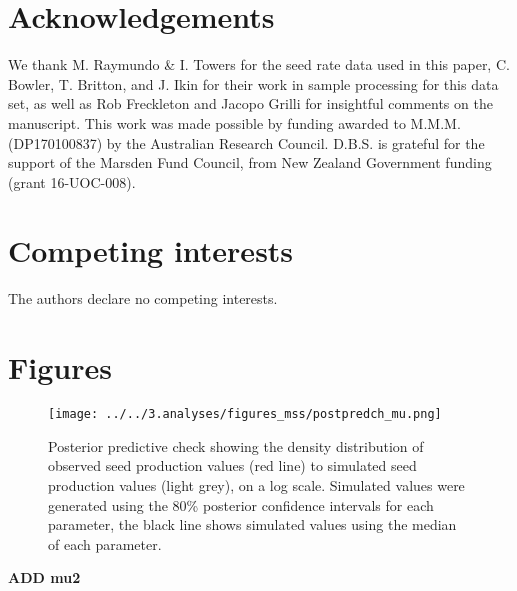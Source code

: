 \documentclass[a4,12pt]{article}
\begin{document}
% 
% 

\section*{Acknowledgements}

We thank M. Raymundo \& I. Towers for the seed rate data used in this paper, C. Bowler, T. Britton, and J. Ikin for their work in sample processing for this data set, as well as Rob Freckleton and Jacopo Grilli for insightful comments on the manuscript. This work was made possible by funding awarded to M.M.M. (DP170100837) by the Australian Research Council. D.B.S. is grateful for the support of the Marsden Fund Council, from New Zealand Government funding (grant 16-UOC-008).


\section*{Competing interests}

The authors declare no competing interests. 


\newpage

\printbibliography   

\newpage 

\section{Figures}


    \begin{figure}[H]
        \texttt{[image: ../../3.analyses/figures\_mss/postpredch\_mu.png]}
        \caption{Posterior predictive check showing the density distribution of observed seed production values (red line) to simulated seed production values (light grey), on a log scale. Simulated values were generated using the 80\% posterior confidence intervals for each parameter, the black line shows simulated values using the median of each parameter. }
        \label{fig:ppcheck}
    \end{figure}

    \textbf{ADD mu2}
\end{document}
